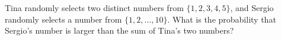 Tina randomly selects two distinct numbers from $\{1,2,3,4,5\}$, and Sergio randomly selects a number from $\{1,2,\dots,10\}$. What is the probability that Sergio's number is larger than the sum of Tina's two numbers?
